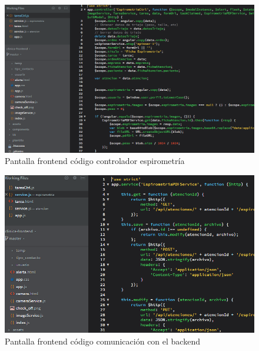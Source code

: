 	\begin{figure}[H]
	    \centering
		\includegraphics[width=16cm]{../imgs/codigo/front-ctrl.png}
		\caption{Pantalla frontend código controlador espirometría}
		\label{figure:front-ctrl}
	\end{figure}
	
	\begin{figure}[H]
	    \centering
		\includegraphics[width=15cm]{../imgs/codigo/front-service.png}
		\caption{Pantalla frontend código comunicación con el backend}
		\label{figure:front-service}
	\end{figure}
	
